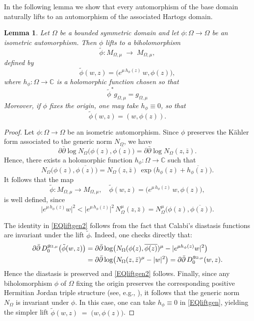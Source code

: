 \documentclass[reqno, 11pt]{amsart}
\newtheorem{lem}[theor]{Lemma}
\newcommand{\C}{\mathbb{C}}
\begin{document}
\noindent
In the following lemma we show that every automorphism of the base domain naturally lifts to an automorphism of the associated Hartogs domain.
\begin{lem}\label{LEMliftgen}
Let $\Omega$ be a bounded symmetric domain and let $\phi\colon \Omega\to\Omega$ be an isometric automorphism.  Then $\phi$ lifts to a biholomorphism 
\[
\tilde\phi\colon M_{\Omega, \mu}\;\longrightarrow\;M_{\Omega, \mu},
\]
defined by
\begin{equation}\label{EQliftgen}
\tilde{\phi}(w, z)
=\bigl(e^{\mu\,h_{\phi}(z)}\,w, \phi(z)\bigr),
\end{equation}
where $h_{\phi}\colon\Omega\to\C$ is a holomorphic function chosen so that
\begin{equation}\label{EQliftgen2}
\tilde\phi^*g_{{\Omega,\mu}} = g_{{\Omega,\mu}}
\end{equation}
Moreover, if $\phi$ fixes the origin, one may take $h_{\phi}\equiv0$, so that
\[
\tilde{\phi}(w, z)=(w, \phi(z)).
\]
\end{lem}

\begin{proof}
Let $\phi\colon \Omega \to \Omega$ be an isometric automorphism.  Since $\phi$ preserves the Kähler form associated to the generic norm $N_\Omega$, we have
\[
\partial\bar\partial\log N_\Omega\bigl(\phi(z),\overline{\phi(z)}\bigr)
=\partial\bar\partial\log N_\Omega(z,\bar z).
\]
Hence, there exists a holomorphic function $h_\phi\colon \Omega\to\C$ such that
\[
N_\Omega\bigl(\phi(z),\overline{\phi(z)}\bigr)
= N_\Omega(z,\bar z)\,\exp\bigl(h_\phi(z)+\overline{h_\phi(z)}\bigr).
\]
It follows that the map
\[
\tilde\phi\colon M_{\Omega, \mu}\longrightarrow M_{\Omega, \mu},
\quad
\tilde\phi(w, z) 
= \bigl(e^{\mu\,h_\phi(z)}\,w, \phi(z)\bigr),
\]
is well defined, since
\[
\bigl|e^{\mu\,h_\phi(z)}w\bigr|^2
< \bigl|e^{\mu\,h_\phi(z)}\bigr|^2\,N^\mu_\Omega(z,\bar z)
= N^\mu_\Omega\bigl(\phi(z),\overline{\phi(z)}\bigr).
\]


The identity  in \eqref{EQliftgen2} follows from the fact that  Calabi's diastasis functions are invariant under the lift $\tilde\phi$.  Indeed, one checks directly that:
\begin{align}
\partial\bar\partial\,D^{g_{{\Omega,\mu}}}_0\bigl(\tilde\phi(w, z)\bigr)
&=\partial\bar\partial\log\bigl(N_\Omega(\phi(z),\overline{\phi(z)})^\mu -|e^{\mu h_\phi(z)}w|^2\bigr)\notag\\
&=\partial\bar\partial\log\bigl(N_\Omega(z,\bar z)^\mu -|w|^2\bigr)
=\partial\bar\partial\,D^{g_{{\Omega,\mu}}}_0(w, z).
\label{EQlemphipb1}
\end{align}
Hence  the diastasis is preserved  and \eqref{EQliftgen2} follows.
Finally, since any biholomorphism \(\phi\) of \(\Omega\) fixing the origin preserves the corresponding positive Hermitian Jordan triple structure (see, e.g., \cite[p.~551]{UPMEIER1984Toeplitzbsd}), it follows that the generic norm \(N_{\Omega}\) is invariant under \(\phi\).  In this case, one can take \(h_{\phi}\equiv0\) in \eqref{EQliftgen}, yielding the simpler lift
$\tilde\phi(w, z) \;=\; \bigl(w, \phi(z)\bigr)$.
\end{proof}
\end{document}

